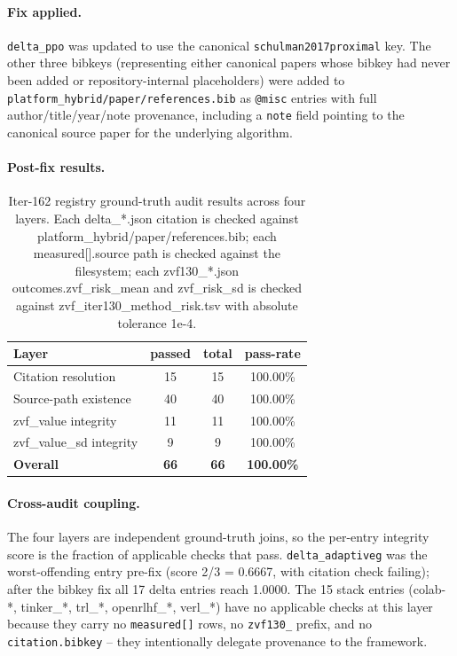 \paragraph{Fix applied.} \texttt{delta\_ppo} was updated to use the
canonical \texttt{schulman2017proximal} key. The other three bibkeys
(representing either canonical papers whose bibkey had never been added or
repository-internal placeholders) were added to \texttt{platform_hybrid/paper/references.bib}
as \texttt{@misc} entries with full author/title/year/note provenance,
including a \texttt{note} field pointing to the canonical source paper for
the underlying algorithm.

\paragraph{Post-fix results.}

\begin{table}[h]
\centering
\small
\begin{tabular}{lccc}
\hline
\textbf{Layer} & \textbf{passed} & \textbf{total} & \textbf{pass-rate} \\
\hline
Citation resolution       & 15 & 15 & 100.00\% \\
Source-path existence     & 40 & 40 & 100.00\% \\
zvf\_value integrity      & 11 & 11 & 100.00\% \\
zvf\_value\_sd integrity  &  9 &  9 & 100.00\% \\
\hline
\textbf{Overall}          & \textbf{66} & \textbf{66} & \textbf{100.00\%} \\
\hline
\end{tabular}
\caption{Iter-162 registry ground-truth audit results across four layers. Each
delta\_*.json citation is checked against platform_hybrid/paper/references.bib; each
measured[].source path is checked against the filesystem; each
zvf130\_*.json outcomes.zvf\_risk\_mean and zvf\_risk\_sd is checked against
zvf\_iter130\_method\_risk.tsv with absolute tolerance 1e-4.}
\label{tab:p6_iter162_layers}
\end{table}

\paragraph{Cross-audit coupling.}
The four layers are independent ground-truth joins, so the per-entry
integrity score is the fraction of applicable checks that pass.
\texttt{delta\_adaptiveg} was the worst-offending entry pre-fix
(score 2/3 = 0.6667, with citation check failing); after the bibkey fix
all 17 delta entries reach 1.0000. The 15 stack entries (colab-*,
tinker\_*, trl\_*, openrlhf\_*, verl\_*) have no applicable checks at this
layer because they carry no \texttt{measured[]} rows, no
\texttt{zvf130\_} prefix, and no \texttt{citation.bibkey} -- they
intentionally delegate provenance to the framework.

